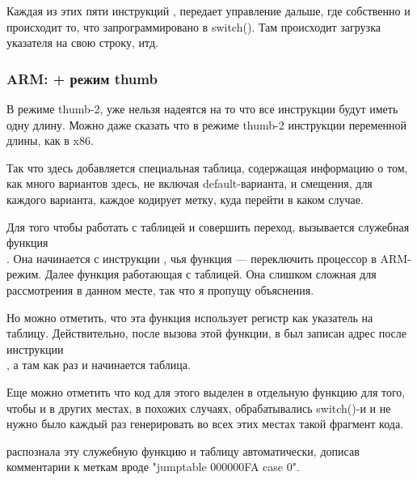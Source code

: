 Каждая из этих пяти инструкций , передает управление дальше, где собственно и происходит то, 
что запрограммировано в switch(). Там происходит загрузка указателя на свою строку, итд.

\subsubsection{ARM: \OptimizingKeil + режим thumb}



В режиме thumb-2, уже нельзя надеятся на то что все инструкции будут иметь одну длину. 
Можно даже сказать что в режиме thumb-2 инструкции переменной длины, как в x86.

Так что здесь добавляется специальная таблица, содержащая информацию о том, как много вариантов здесь,
не включая default-варианта, и смещения, для каждого варианта, каждое кодирует метку, куда перейти в 
каком случае.

Для того чтобы работать с таблицей и совершить переход, вызывается служебная функция \\
. Она начинается с инструкции , чья функция --- 
переключить процессор в ARM-режим. Далее функция работающая с таблицей. Она слишком сложная для 
рассмотрения в данном месте, так что я пропущу объяснения.

Но можно отметить, что эта функция использует
регистр \LR как указатель на таблицу. Действительно, после вызова этой функции, в \LR был записан
адрес после инструкции \\ 
, а там как раз и начинается таблица.

Еще можно отметить что код для этого выделен в отдельную функцию для того, чтобы и в других местах,
в похожих случаях, обрабатывались switch()-и и не нужно было каждый раз генерировать во всех этих
местах такой фрагмент кода.

\IDA распознала эту служебную функцию и таблицу автоматически, 
дописав комментарии к меткам вроде "jumptable 000000FA case 0".
